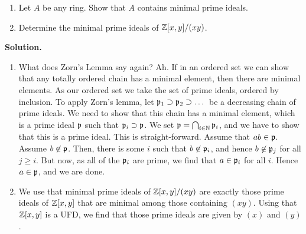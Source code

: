 \documentclass[a4paper,11pt]{article}
\begin{document}
\begin{enumerate}
    \item Let $A$ be any ring. Show that $A$ contains minimal prime ideals. 
    \item Determine the minimal prime ideals of $\mathbb{Z}[x,y]/(xy)$. 
\end{enumerate}

\textbf{Solution.}
\begin{enumerate}
    \item What does Zorn's Lemma say again? Ah. If in an ordered set we can
        show that any totally ordered chain has a minimal element, then there
        are minimal elements. As our ordered set we take the set of prime ideals,
        ordered by inclusion. To apply Zorn's lemma, let $\mathfrak{p}_1 \supset \mathfrak{p}_2
        \supset \dots$ be a decreasing chain of prime ideals. We need to show
        that this chain has a minimal element, which is a prime ideal 
        $\mathfrak{p}$ such that $\mathfrak{p}_i \supset \mathfrak{p}$. We set $\mathfrak{p} = \bigcap_{i \in \mathbb{N}}
        \mathfrak{p}_i$, and we have to show that this is a prime ideal. This is
        straight-forward. Assume that $ab \in \mathfrak{p}$. Assume $b \not \in \mathfrak{p}$.
        Then, there is some $i$ such that $b \not \in \mathfrak{p}_i$, and hence $b \not
        \in \mathfrak{p}_j$ for all $j \geq i$. But now, as all of the $\mathfrak{p}_i$ are
        prime, we find that $a \in \mathfrak{p}_i$ for all $i$. Hence $a \in \mathfrak{p}$, and
        we are done. 
    \item We use that minimal prime ideals of $\mathbb{Z}[x,y]/(xy)$ are exactly those
        prime ideals of $\mathbb{Z}[x,y]$ that are minimal among those containing
        $(xy)$. Using that $\mathbb{Z}[x,y]$ is a UFD, we find that those prime ideals
        are given by $(x)$ and $(y)$.
\end{enumerate}

\contactend
\end{document}
